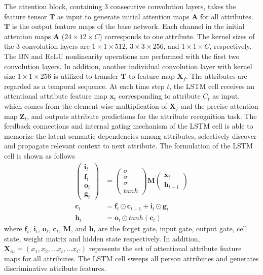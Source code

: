 \documentclass[sigconf]{acmart}
\begin{document}
The attention block, containing 3 consecutive convolution layers, takes the feature tensor $\boldsymbol{T}$ as input to generate initial attention maps $\boldsymbol{A}$ for all attributes. $\boldsymbol{T}$ is the output feature maps of the base network. Each channel in the initial attention maps $\boldsymbol{A}$ ($24\times12\times C$) corresponds to one attribute. The kernel sizes of the 3 convolution layers are $1\times1\times512$,  $3\times3\times256$, and $1\times1\times C$, respectively. The BN and ReLU nonlinearity operations are performed with the first two convolution layers. In addition, another individual convolution layer with kernel size $1\times1\times256$ is utilized to transfer $\boldsymbol{T}$ to feature map $\boldsymbol{X}_f$. The attributes are regarded as a temporal sequence. At each time step $t$, the LSTM cell receives an attentional attribute feature map $\boldsymbol{x}_t$ corresponding to attribute $C_t$ as input, which comes from the element-wise multiplication of $\boldsymbol{X}_f$ and the precise attention map $\boldsymbol{Z}_t$, and outputs attribute predictions for the attribute recognition task. The feedback connections and internal gating mechanism of the LSTM cell is able to memorize the latent semantic dependencies among attributes, selectively discover and propagate relevant context to next attribute. The formulation of the LSTM cell is shown as follows
\begin{equation}
\begin{split}
\left( \begin{array}{c}
\bm{i}_{t}\\
\bm{f}_{t}\\
\bm{o}_{t}\\
\bm{g}_{t}
\end{array} \right) &= \left( \begin{array}{c}
\sigma\\
\sigma\\
\sigma\\
tanh
\end{array} \right)\bm{M}\left(\begin{array}{c}
\bm{x}_t\\
\bm{h}_{t-1}
\end{array}\right)\\
\bm{c}_t &= \bm{f}_t\odot \bm{c}_{t-1} + \bm{i}_t\odot \bm{g}_{t}\\
\bm{h}_t &= \bm{o}_t\odot tanh(\bm{c}_t)
\end{split}
\end{equation}
where $\boldsymbol{f}_t$, $\boldsymbol{i}_t$, $\boldsymbol{o}_t$, $\boldsymbol{c}_t$, $\boldsymbol{M}$, and $\boldsymbol{h}_t$ are the forget gate, input gate, output gate, cell state, weight matrix and hidden state respectively. In addition, $\boldsymbol{X}_{in} = (x_1,x_2,...x_t,...x_C)$ represents the set of attentional attribute feature maps for all attributes. The LSTM cell sweeps all person attributes and generates discriminative attribute features.
\end{document}

